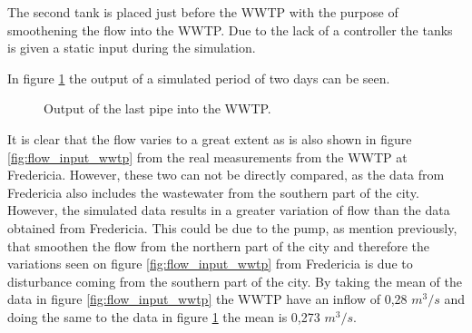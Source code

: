 The second tank is placed just before the WWTP with the purpose of smoothening the flow into the WWTP. %
Due to the lack of a controller the tanks is given a static input during the simulation.


In figure \ref{fig:simulation_output_first} the output of a simulated period of two days can be seen. 

\begin{figure}[H]
\centering

\caption{Output of the last pipe into the WWTP.}
\label{fig:simulation_output_first}
\end{figure}  

It is clear that the flow varies to a great extent as is also shown in figure \ref{fig:flow_input_wwtp} from the real measurements from the WWTP at Fredericia. However, these two can not be directly compared, as the data from Fredericia also includes the wastewater from the southern part of the city. %
However, the simulated data results in a greater variation of flow than the data obtained from Fredericia. This could be due to the pump, as mention previously, that smoothen the flow from the northern part of the city and therefore the variations seen on figure \ref{fig:flow_input_wwtp} from Fredericia is due to disturbance coming from the southern part of the city. By taking the mean of the data in figure \ref{fig:flow_input_wwtp} the WWTP have an inflow of 0,28 $m^3/s$ and doing the same to the data in figure \ref{fig:simulation_output_first} the mean is 0,273 $m^3/s$. 


